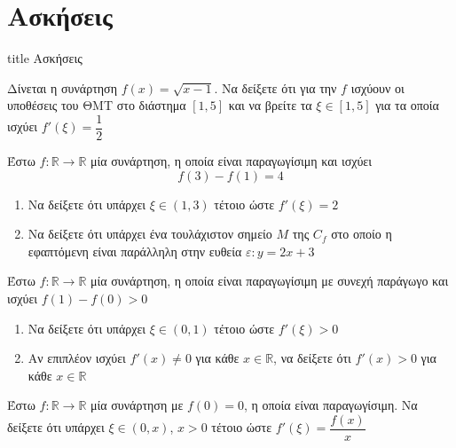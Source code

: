 \documentclass{presentation}
\begin{document}
\section{Ασκήσεις}

\begin{frame}[noframenumbering]
  \vfill
  \centering
  \begin{beamercolorbox}[sep=8pt,center,shadow=true,rounded=true]{title}
    Ασκήσεις
  \end{beamercolorbox}
  \vfill
\end{frame}

\begin{askisi}
  Δίνεται η συνάρτηση $f(x)=\sqrt{x-1}$. Να δείξετε ότι για την $f$ ισχύουν οι υποθέσεις του ΘΜΤ στο διάστημα $[1,5]$ και να βρείτε τα $ξ\in [1,5]$ για τα οποία ισχύει $f'(ξ)=\dfrac{1}{2}$

\end{askisi}

\begin{askisi}
  Έστω $f:\mathbb{R}\to\mathbb{R}$ μία συνάρτηση, η οποία είναι παραγωγίσιμη και ισχύει
  $$f(3)-f(1)=4$$
  \begin{enumerate}
    \item<1-> Να δείξετε ότι υπάρχει $ξ\in (1,3)$ τέτοιο ώστε $f'(ξ)=2$
    \item<2-> Να δείξετε ότι υπάρχει ένα τουλάχιστον σημείο $Μ$ της $C_f$ στο οποίο η εφαπτόμενη είναι παράλληλη στην ευθεία $ε:y=2x+3$
  \end{enumerate}

\end{askisi}

\begin{askisi}
  Έστω $f:\mathbb{R}\to\mathbb{R}$ μία συνάρτηση, η οποία είναι παραγωγίσιμη με συνεχή παράγωγο και ισχύει $f(1)-f(0)>0$
  \begin{enumerate}
    \item<1-> Να δείξετε ότι υπάρχει $ξ\in (0,1)$ τέτοιο ώστε $f'(ξ)>0$
    \item<2-> Αν επιπλέον ισχύει $f'(x)\ne 0$ για κάθε $x\in\mathbb{R}$, να δείξετε ότι $f'(x)>0$ για κάθε $x\in\mathbb{R}$
  \end{enumerate}

\end{askisi}

\begin{askisi}
  Έστω $f:\mathbb{R}\to\mathbb{R}$ μία συνάρτηση με $f(0)=0$, η οποία είναι παραγωγίσιμη. Να δείξετε ότι υπάρχει $ξ\in (0,x)$, $x>0$ τέτοιο ώστε $f'(ξ)=\dfrac{f(x)}{x}$

\end{askisi}
\end{document}
